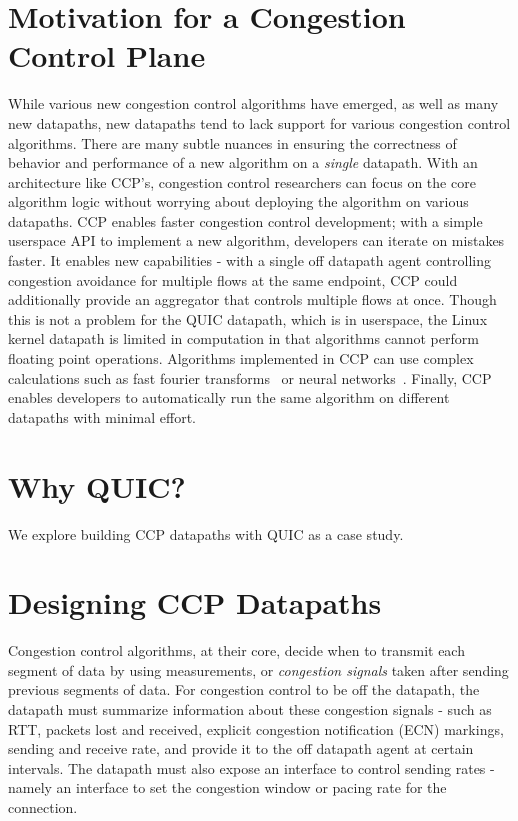 \section{Motivation for a Congestion Control Plane}
While various new congestion control algorithms have emerged, as well as many new datapaths, new datapaths tend to lack support for various congestion control algorithms.
There are many subtle nuances in ensuring the correctness of behavior and performance of a new algorithm on a \textit{single} datapath.
With an architecture like CCP's, congestion control researchers can focus on the core algorithm logic without worrying about  deploying the algorithm on various datapaths.
CCP enables faster congestion control development; with a simple userspace API to implement a new algorithm, developers can iterate on mistakes faster.
It enables new capabilities - with a single off datapath agent controlling congestion avoidance for multiple flows at the same endpoint, CCP could additionally provide an aggregator that controls multiple flows at once.
Though this is not a problem for the QUIC datapath, which is in userspace, the Linux kernel datapath is limited in computation in that algorithms cannot perform floating point operations.
Algorithms implemented in CCP can use complex calculations such as fast fourier transforms~\cite{nimbus} or neural networks~\cite{indigo}.
Finally, CCP enables developers to automatically run the same algorithm on different datapaths with minimal effort.

\section{Why QUIC?}
We explore building CCP datapaths with QUIC as a case study.
\section{Designing CCP Datapaths}
Congestion control algorithms, at their core, decide when to transmit each segment of data by using measurements, or \textit{congestion signals} taken after sending previous segments of data.
For congestion control to be off the datapath, the datapath must summarize information about these congestion signals - such as RTT, packets lost and received, explicit congestion notification (ECN) markings, sending and receive rate, and provide it to the off datapath agent at certain intervals.
The datapath must also expose an interface to control sending rates - namely an interface to set the congestion window or pacing rate for the connection.

